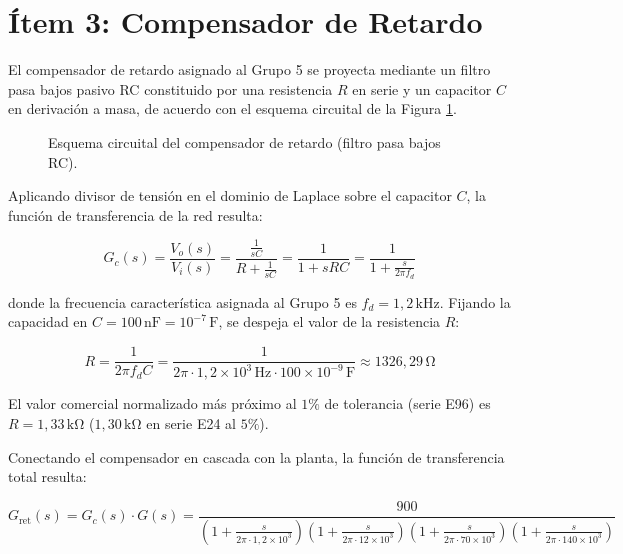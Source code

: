 \clearpage

\section{Ítem 3: Compensador de Retardo}

El compensador de retardo asignado al Grupo 5 se proyecta mediante un filtro pasa bajos pasivo RC constituido por una
resistencia $R$ en serie y un capacitor $C$ en derivación a masa, de acuerdo con el esquema circuital de la Figura
\ref{crkt.ej2:retardo}.

\begin{figure}[!ht]
    \centering
    
    \caption{Esquema circuital del compensador de retardo (filtro pasa bajos RC).}
    \label{crkt.ej2:retardo}
\end{figure}

Aplicando divisor de tensión en el dominio de Laplace sobre el capacitor $C$, la función de transferencia de la red resulta:

\begin{equation}
    G_c(s) = \frac{V_o(s)}{V_i(s)} = \frac{\frac{1}{sC}}{R + \frac{1}{sC}} = \frac{1}{1 + sRC} = \frac{1}{1 + \frac{s}{2\pi f_d}}
    \label{eq.ej2:fdt_comp_retardo}
\end{equation}

donde la frecuencia característica asignada al Grupo 5 es $f_d = 1,2\,\si{\kilo\hertz}$. Fijando la capacidad en $C = 100\,\si{\nano\farad} = 10^{-7}\,\si{\farad}$,
se despeja el valor de la resistencia $R$:

\begin{equation}
    R = \frac{1}{2\pi f_d C} = \frac{1}{2\pi \cdot 1,2 \times 10^3\,\si{\hertz} \cdot 100 \times 10^{-9}\,\si{\farad}} \approx 1326,29\,\si{\ohm}
    \label{eq.ej2:calculo_R_retardo}
\end{equation}

El valor comercial normalizado más próximo al $1\%$ de tolerancia (serie E96) es $R = 1,33\,\si{\kilo\ohm}$ ($1,30\,\si{\kilo\ohm}$
en serie E24 al $5\%$).

Conectando el compensador en cascada con la planta, la función de transferencia total resulta:

\begin{equation}
    G_{\text{ret}}(s) = G_c(s) \cdot G(s) = \frac{900}{\left(1 + \frac{s}{2\pi \cdot 1,2 \times 10^3}\right) \left(1 + \frac{s}{2\pi \cdot 12 \times 10^3}\right) \left(1 + \frac{s}{2\pi \cdot 70 \times 10^3}\right) \left(1 + \frac{s}{2\pi \cdot 140 \times 10^3}\right)}
    \label{eq.ej2:fdt_sistema_retardo}
\end{equation}

